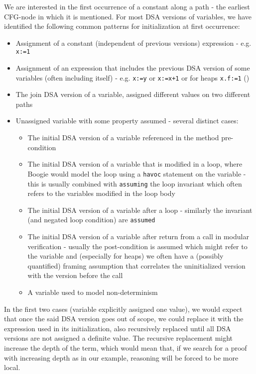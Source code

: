 We are interested in the first occurrence of a constant along a path - the earliest CFG-node in which it is mentioned.
For most DSA versions of variables, we have identified the following common patterns for initialization at first occurrence:
\begin{itemize}
	\item Assignment of a constant (independent of previous versions) expression - e.g. \lstinline|x:=1|
	\item Assignment of an expression that includes the previous DSA version of some variables (often including itself) 
	- e.g. \lstinline|x:=y| or \lstinline|x:=x+1| or for heaps \lstinline|x.f:=1| ()
	\item The join DSA version of a variable, assigned different values on two different paths
	\item Unassigned variable with some property assumed - several distinct cases:
		\begin{itemize}
			\item The initial DSA version of a variable referenced in the method pre-condition
			\item The initial DSA version of a variable that is modified in a loop, where Boogie would model the loop using a \lstinline|havoc| statement on the variable - this is usually combined with \lstinline|assuming| the loop invariant which often refers to the variables modified in the loop body
			\item The initial DSA version of a variable after a loop - similarly the invariant (and negated loop condition) are \lstinline|assumed|
			\item The initial DSA version of a variable after return from a call in modular verification - usually the post-condition is assumed which might refer to the variable and (especially for heaps) we often have a (possibly quantified) framing assumption that correlates the uninitialized version with the version before the call
			\item A variable used to model non-determinism
		\end{itemize}
\end{itemize}

In the first two cases (variable explicitly assigned one value), we would expect that once the said DSA version goes out of scope, we could replace it with the expression used in its initialization, also recursively replaced until all DSA versions are not assigned a definite value. The recursive replacement might increase the depth of the term, 
which would mean that, if we search for a proof with increasing depth as in our example, reasoning will be forced to be more local.


